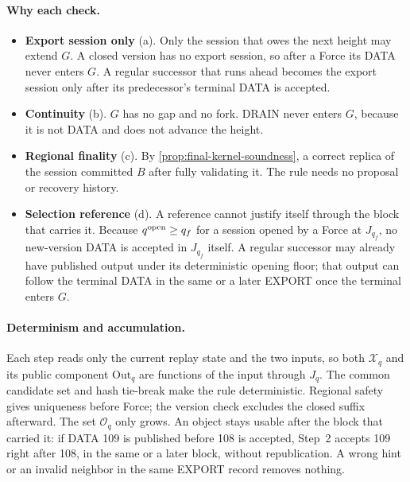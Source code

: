\documentclass[11pt,a4paper]{article}
\begin{document}
\paragraph{Why each check.}
\begin{itemize}[itemsep=2pt]
\item \textbf{Export session only} (a). Only the session that owes the
next height may extend $G$. A closed version has no export session, so
after a Force its DATA never enters $G$. A regular successor that runs
ahead becomes the export session only after its predecessor's terminal
DATA is accepted.
\item \textbf{Continuity} (b). $G$ has no gap and no fork. DRAIN never
enters $G$, because it is not DATA and does not advance the height.
\item \textbf{Regional finality} (c). By
\cref{prop:final-kernel-soundness}, a correct replica of the session
committed $B$ after fully validating it. The rule needs no proposal or
recovery history.
\item \textbf{Selection reference} (d). A reference cannot justify itself
through the block that carries it. Because $q^{\rm open}\ge q_f$ for a
session opened by a Force at $J_{q_f}$, no new-version DATA is accepted
in $J_{q_f}$ itself.  A regular successor may already have published
output under its deterministic opening floor; that output can follow the
terminal DATA in the same or a later EXPORT once the terminal enters
$G$.
\end{itemize}

\paragraph{Determinism and accumulation.}
Each step reads only the current replay state and the two inputs, so both
$\mathcal X_q$ and its public component $\mathrm{Out}_q$ are functions of
the input through $J_q$. The common candidate set and hash tie-break
make the rule deterministic. Regional safety gives uniqueness before
Force; the version check excludes the closed suffix afterward. The set $\mathcal O_q$ only grows. An object stays
usable after the block that carried it: if DATA 109 is published before
108 is accepted, Step~2 accepts 109 right after 108, in the same or a
later block, without republication. A wrong hint or an invalid neighbor
in the same EXPORT record removes nothing.
\end{document}
